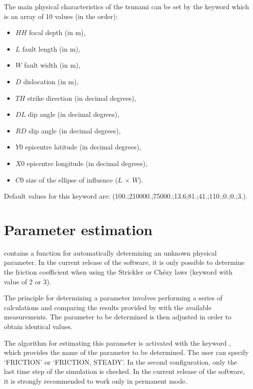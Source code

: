The main physical characteristics of the tsunami can be set by the keyword
 which is an array of
10 values (in the order):
\begin{itemize}
\item $HH$ focal depth (in m),
\item $L$ fault length (in m),
\item $W$ fault width (in m),
\item $D$ dislocation (in m),
\item $TH$ strike direction (in decimal degrees),
\item $DL$ dip angle (in decimal degrees),
\item $RD$ slip angle (in decimal degrees),
\item $Y0$ epicentre latitude (in decimal degrees),
\item $X0$ epicentre longitude (in decimal degrees),
\item $C0$ size of the ellipse of influence ($L$ $\times$ $W$).
\end{itemize}
Default values for this keyword are:
(100.;210000.;75000.;13.6;81.;41.;110.;0.;0.;3.).


\section{Parameter estimation}

 contains a function for automatically determining an unknown
physical parameter.
In the current release of the software, it is only possible to determine the
friction coefficient when using the Strickler or Ch\'{e}zy laws (keyword
 with value of 2 or 3).

The principle for determining a parameter involves performing a series of
calculations and comparing the results provided by  with the
available measurements.
The parameter to be determined is then adjusted in order to obtain identical
values.

The algorithm for estimating this parameter is activated with the keyword
, which provides the name of the parameter to be
determined.
The user can specify `FRICTION' or `FRICTION, STEADY'.
In the second configuration, only the last time step of the simulation is
checked.
In the current release of the software, it is strongly recommended to work only
in permanent mode.

